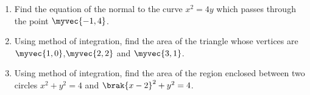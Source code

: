 \begin{enumerate}

\item Find the equation of the normal to the curve ${x}^2 = 4y$ which passes through the point $\myvec{-1,4}$.

\item Using method of integration, find the area of the triangle whose vertices are $\myvec{1,0}$,$\myvec{2,2}$ and $\myvec{3,1}$.

\item Using method of integration, find the area of the region enclosed between two circles ${x^2+y^2=4}$ and $\brak{x-2}^2+{y^2}=4$.

\end{enumerate}
